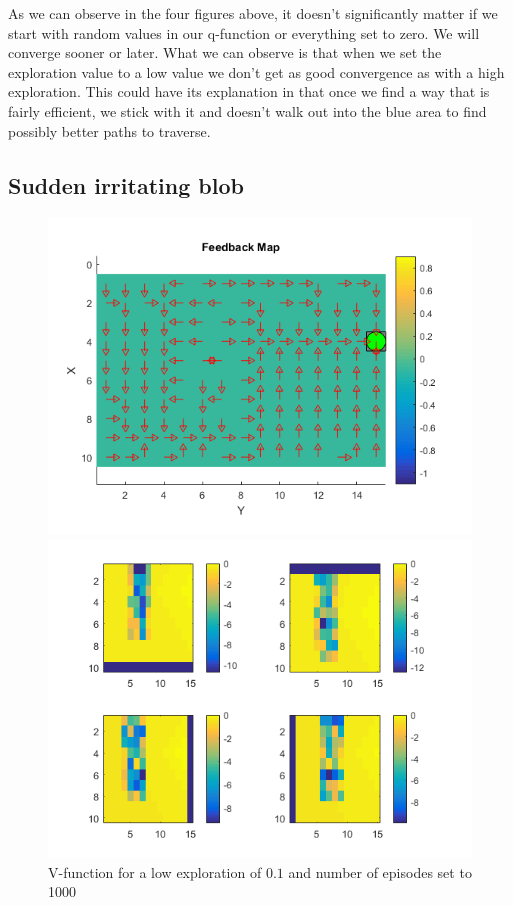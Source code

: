 \documentclass[a4paper,12pt]{article}
\begin{document}
As we can observe in the four figures above, it doesn't significantly matter if we start with random values in our q-function or everything set to zero. We will converge sooner or later. What we can observe is that when we set the exploration value to a low value we don't get as good convergence as with a high exploration. This could have its explanation in that once we find a way that is fairly efficient, we stick with it and doesn't walk out into the blue area to find possibly better paths to traverse.

\subsection{Sudden irritating blob}

\begin{figure}[H]
\centering
  \begin{minipage}[]{0.6\textwidth}
  \includegraphics[width=\textwidth]{figures/2_v_low_exploration.png}
  \caption{V-function for a low exploration of $0.1$ and number of episodes set to 1000}\label{fig:2_v_low_exploration}
  \end{minipage}
    \begin{minipage}[]{0.6\textwidth}
   \includegraphics[width=\textwidth]{figures/2_q_low_exploration.png}

\end{minipage}
\end{figure}
\end{document}

